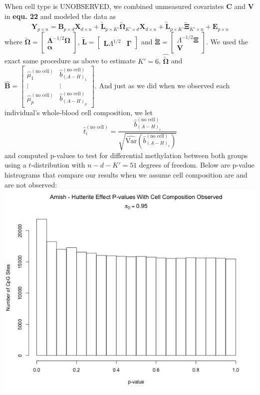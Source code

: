\documentclass{article}
\begin{document}
\indent When cell type is UNOBSERVED, we combined unmeasured covariates $\bm{C}$ and $\bm{V}$ in \textbf{equ. 22} and modeled the data as
\begin{equation}
\bm{Y}_{p \times n} = \bm{B}_{p \times d}\bm{X}_{d \times n} + \tilde{\bm{L}}_{p \times K'}\tilde{\bm{\Omega}}_{K' \times d}\bm{X}_{d \times n} + \tilde{\bm{L}}_{p \times K'}\tilde{\bm{\Xi}}_{K' \times n} + \bm{E}_{p \times n}
\end{equation}
where $\tilde{\bm{\Omega}} = \left[ \begin{matrix}
\bm{\Lambda}^{-1/2}\bm{\Omega}\\
\bm{\alpha}
\end{matrix} \right]$, $\bm{\tilde{L}} = \left[ \begin{matrix}
\bm{L}\Lambda^{1/2} & \bm{\Gamma}
\end{matrix} \right]$ and $\tilde{\bm{\Xi}} = \left[ \begin{matrix}
\Lambda^{-1/2}\bm{\Xi}\\
\bm{V}
\end{matrix} \right]$. We used the exact same procedure as above to estimate $K' = 6$, $\hat{\tilde{\bm{\Omega}}}$ and $\hat{\bm{B}} = \left[ \begin{matrix}
\hat{\mu}_1^{(\text{no cell})} & \hat{b}_{(A-H)_1}^{(\text{no cell})}\\
\vdots & \vdots\\
\hat{\mu}_p^{(\text{no cell})} & \hat{b}_{(A-H)_p}^{(\text{no cell})}
\end{matrix} \right]$. And just as we did when we observed each individual's whole-blood cell composition, we let
\begin{equation}
\hat{t}_i^{(\text{no cell})} = \frac{\hat{b}_{(A-H)_i}^{(\text{no cell})}}{\sqrt{\hat{\text{Var}}\left( \hat{b}_{(A-H)_i}^{(\text{no cell})} \right)}}
\end{equation}
and computed p-values to test for differential methylation between both groups using a $t$-distribution with $n - d - K' = 51$ degrees of freedom. Below are p-value histrograms that compare our results when we assume cell composition are and are not observed:\\
\includegraphics[scale=0.4]{AmishHutterite_CellPvalues.jpeg}
\end{document}
